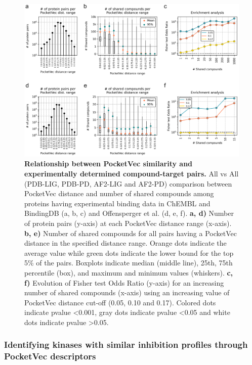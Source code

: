 \begin{figure}[H]
  \centering
  \includegraphics[width=\linewidth]{figures/PocketVec/Main/Fig6.png} 
  \caption{
    \textbf{Relationship between PocketVec similarity and experimentally determined compound-target pairs.}
    All vs All (PDB-LIG, PDB-PD, AF2-LIG and AF2-PD) comparison between PocketVec distance and number of shared compounds among proteins having experimental binding data in ChEMBL and BindingDB (a, b, c) and Offensperger et al.\cite{offensperger_large-scale_2024} (d, e, f).
    \textbf{a, d)} Number of protein pairs (y-axis) at each PocketVec distance range (x-axis).
    \textbf{b, e)} Number of shared compounds for all pairs having a PocketVec distance in the specified distance range. Orange dots indicate the average value while green dots indicate the lower bound for the top 5\% of the pairs. Boxplots indicate median (middle line), 25th, 75th percentile (box), and maximum and minimum values (whiskers). 
    \textbf{c, f)} Evolution of Fisher test Odds Ratio (y-axis) for an increasing number of shared compounds (x-axis) using an increasing value of PocketVec distance cut-off (0.05, 0.10 and 0.17). Colored dots indicate pvalue <0.001, gray dots indicate pvalue <0.05 and white dots indicate pvalue >0.05.
  }
  \label{PocketVec_Fig6}
\end{figure}


\subsubsection{Identifying kinases with similar inhibition profiles through PocketVec descriptors}
\label{PocketVec_ResultsAndDiscussion_Identifying_Kinases}

